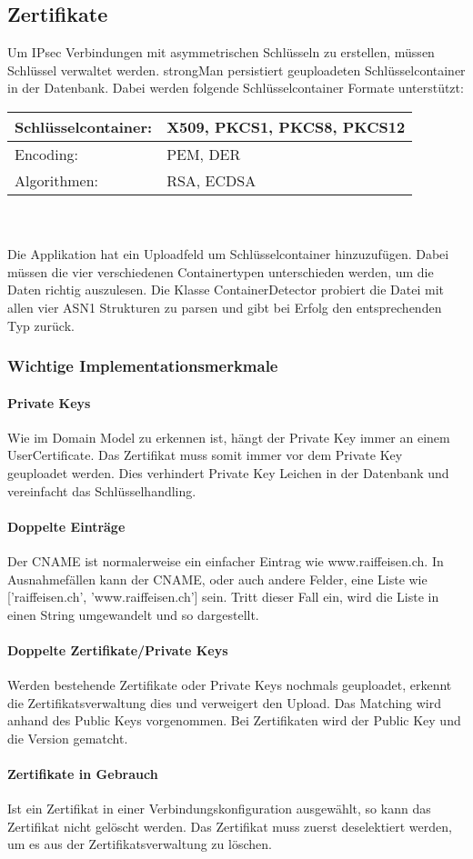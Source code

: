 \subsection{Zertifikate}
Um IPsec Verbindungen mit asymmetrischen Schlüsseln zu erstellen, müssen Schlüssel verwaltet werden. strongMan persistiert geuploadeten Schlüsselcontainer in der Datenbank.
Dabei werden folgende Schlüsselcontainer Formate unterstützt: \\

\begin{tabular}{ | p{} | p{} | }
\hline
    Schlüsselcontainer: & X509, PKCS1, PKCS8, PKCS12 \\ \hline
    Encoding: & PEM, DER \\ \hline
    Algorithmen: & RSA, ECDSA \\ \hline
\end{tabular}
\\\\
Die Applikation hat ein Uploadfeld um Schlüsselcontainer hinzuzufügen. Dabei müssen die vier verschiedenen Containertypen unterschieden werden, um die Daten richtig auszulesen. Die Klasse ContainerDetector probiert die Datei mit allen vier ASN1 Strukturen zu parsen und gibt bei Erfolg den entsprechenden Typ zurück.

\subsubsection{Wichtige Implementationsmerkmale}
\paragraph{Private Keys} Wie im Domain Model zu erkennen ist, hängt der Private Key immer an einem UserCertificate. Das Zertifikat muss somit immer vor dem Private Key geuploadet werden. Dies verhindert Private Key Leichen in der Datenbank und vereinfacht das Schlüsselhandling.

\paragraph{Doppelte Einträge} Der CNAME ist normalerweise ein einfacher Eintrag wie www.raiffeisen.ch. In Ausnahmefällen kann der CNAME, oder auch andere Felder, eine Liste wie ['raiffeisen.ch', 'www.raiffeisen.ch'] sein. Tritt dieser Fall ein, wird die Liste in einen String umgewandelt und so dargestellt.

\paragraph{Doppelte Zertifikate/Private Keys}
Werden bestehende Zertifikate oder Private Keys nochmals geuploadet, erkennt die Zertifikatsverwaltung dies und verweigert den Upload. Das Matching wird anhand des Public Keys vorgenommen. Bei Zertifikaten wird der Public Key und die Version gematcht.

\paragraph{Zertifikate in Gebrauch}
Ist ein Zertifikat in einer Verbindungskonfiguration ausgewählt, so kann das Zertifikat nicht gelöscht werden. Das Zertifikat muss zuerst deselektiert werden, um es aus der Zertifikatsverwaltung zu löschen.

\newpage



